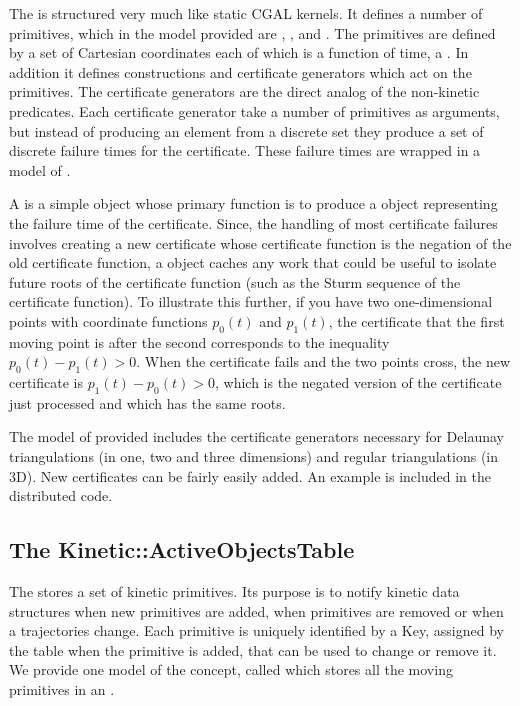 The  is structured very much like static CGAL
kernels. It defines a number of primitives, which in the model
provided are ,
,  and
. The primitives are defined by
a set of Cartesian coordinates each of which is a function of time, a
. In addition it defines constructions
and certificate generators which act on the primitives.  The
certificate generators are the direct analog of the non-kinetic
predicates. Each certificate generator take a number of primitives as
arguments, but instead of producing an element from a discrete set
they produce a set of discrete failure times for the certificate.
These failure times are wrapped in a model of .

A  is a simple object whose primary function is to
produce a  object representing the failure time of the
certificate.  Since, the handling of most certificate failures
involves creating a new certificate whose certificate function is the
negation of the old certificate function, a 
object caches any work that could be useful to isolate future roots of
the certificate function (such as the Sturm sequence of the
certificate function). To illustrate this further, if you have two
one-dimensional points with coordinate functions $p_0(t)$ and
$p_1(t)$, the certificate that the first moving point is after the
second corresponds to the inequality $p_0(t) - p_1(t) > 0$.  When the
certificate fails and the two points cross, the new certificate is
$p_1(t)- p_0(t) > 0$, which is the negated version of the certificate
just processed and which has the same roots.

The model of  provided includes the certificate
generators necessary for Delaunay triangulations (in one, two and
three dimensions) and regular triangulations (in 3D).  New
certificates can be fairly easily added. An example is included in the
distributed code.



\subsection{The Kinetic::ActiveObjectsTable}
\label{active_objects_table}

The  stores a set of kinetic primitives.
Its purpose is to notify kinetic data structures when new primitives
are added, when primitives are removed or when a trajectories change.
Each primitive is uniquely identified by a Key, assigned by
the table when the primitive is added, that can be used to change or
remove it.  We provide one model of the
 concept, called
 which stores all the moving
primitives in an .

